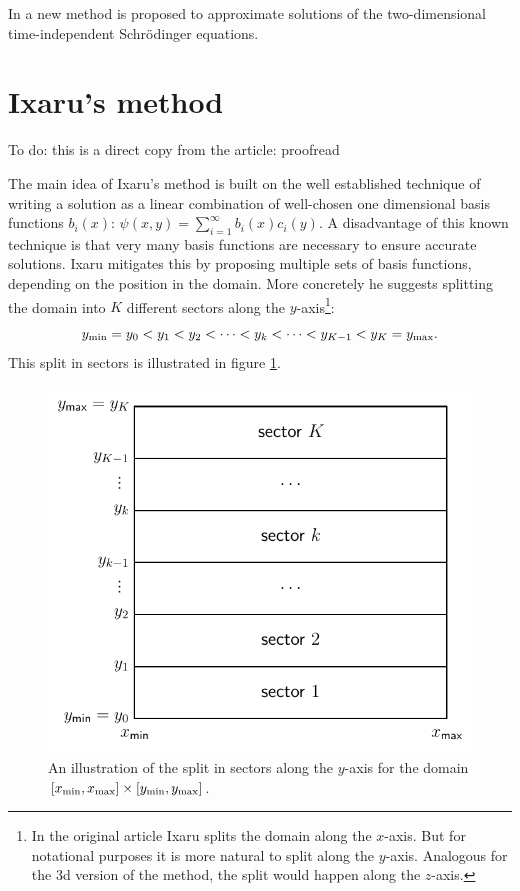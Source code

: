 In \cite{ixaru_new_2010} a new method is proposed to approximate solutions of the two-dimensional time-independent Schrödinger equations.

\section{Ixaru's method}

 {\color{red} To do: this is a direct copy from the article: proofread}

The main idea of Ixaru's method is built on the well established technique \cite{titchmarsh_eigenfunction_1962} of writing a solution as a linear combination of well-chosen one dimensional basis functions $b_i(x)$: $\psi(x, y) = \sum_{i=1}^\infty b_i(x) c_i(y)$. A disadvantage of this known technique is that very many basis functions are necessary to ensure accurate solutions. Ixaru mitigates this by proposing multiple sets of basis functions, depending on the position in the domain. More concretely he suggests splitting the domain into $K$ different sectors along the $y$-axis\footnote{In the original article \cite{ixaru_new_2010} Ixaru splits the domain along the $x$-axis. But for notational purposes it is more natural to split along the $y$-axis. Analogous for the 3d version of the method, the split would happen along the $z$-axis.}:
$$
    {y_{\text{min}}} = y_0 < y_1 < y_2 < \dots < y_k < \dots < y_{K-1} < y_{K} = {y_{\text{max}}}\text{.}
$$
This split in sectors is illustrated in figure \ref{fig:c3_2dsectors}.

\begin{figure}
    \begin{center}
        \includegraphics[width=.6\textwidth]{img/chapter3/2dsectors.pdf}
        \caption{\label{fig:c3_2dsectors} An illustration of the split in sectors along the $y$-axis for the domain $[{x_{\text{min}}}, {x_{\text{max}}}]\times[{y_{\text{min}}}, {y_{\text{max}}}]$.}
    \end{center}
\end{figure}

